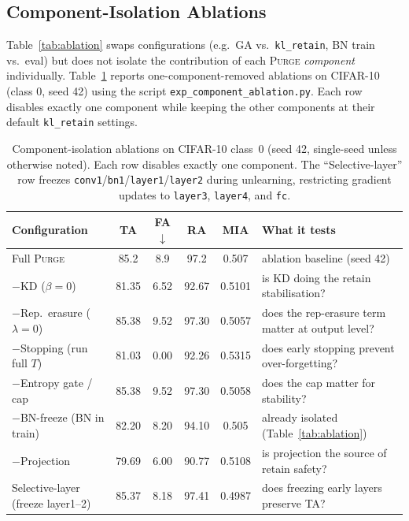 \documentclass{article}
\newcommand{\ours}{\textsc{Purge}}
\newcommand{\klr}{\texttt{kl\_retain}}
\newcommand{\new}[1]{{\color{orange}#1}}
\begin{document}
\new{
\subsection{Component-Isolation Ablations}\label{sec:comp_iso}

Table~\ref{tab:ablation} swaps configurations (e.g.\ GA vs.\ \klr{}, BN train vs.\ eval) but does not isolate the contribution of each \ours{} \emph{component} individually. Table~\ref{tab:comp_iso} reports one-component-removed ablations on CIFAR-10 (class 0, seed 42) using the script \texttt{exp\_component\_ablation.py}. Each row disables exactly one component while keeping the other components at their default \klr{} settings.

\begin{table}[t]
\centering
\small
\begin{tabular}{lccccl}
\toprule
\textbf{Configuration} & \textbf{TA} & \textbf{FA}$\downarrow$ & \textbf{RA} & \textbf{MIA} & \textbf{What it tests} \\
\midrule
Full \ours{}                       & 85.2  & 8.9  & 97.2  & 0.507  & \new{ablation baseline (seed 42)} \\
$-$KD ($\beta = 0$)                & 81.35 & 6.52 & 92.67 & 0.5101 & is KD doing the retain stabilisation? \\
$-$Rep.\ erasure ($\lambda = 0$)   & 85.38 & 9.52 & 97.30 & 0.5057 & does the rep-erasure term matter at output level? \\
$-$Stopping (run full $T$)         & 81.03 & 0.00 & 92.26 & 0.5315 & does early stopping prevent over-forgetting? \\
$-$Entropy gate / cap              & 85.38 & 9.52 & 97.30 & 0.5058 & does the cap matter for stability? \\
$-$BN-freeze (BN in train)         & 82.20 & 8.20 & 94.10 & 0.505  & already isolated (Table~\ref{tab:ablation}) \\
$-$Projection                      & 79.69 & 6.00 & 90.77 & 0.5108 & is projection the source of retain safety? \\
Selective-layer (freeze layer1--2) & 85.37 & 8.18 & 97.41 & 0.4987 & does freezing early layers preserve TA? \\
\bottomrule
\end{tabular}
\caption{Component-isolation ablations on CIFAR-10 class~0 (seed 42, single-seed unless otherwise noted). Each row disables exactly one component. The ``Selective-layer'' row freezes \texttt{conv1}/\texttt{bn1}/\texttt{layer1}/\texttt{layer2} during unlearning, restricting gradient updates to \texttt{layer3}, \texttt{layer4}, and \texttt{fc}.}
\label{tab:comp_iso}
\end{table}

}
\end{document}
